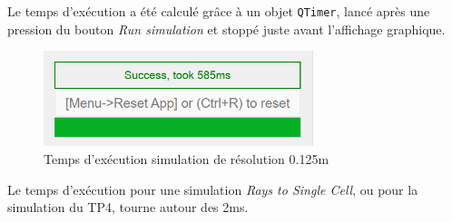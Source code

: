 Le temps d'exécution a été calculé grâce à un objet \texttt{QTimer}, lancé après une pression du bouton \textit{Run simulation} et stoppé juste avant l'affichage graphique.
\begin{figure}[H]
    \centering
    \includegraphics[width=0.7\textwidth]{latex/images/time-0.125m.png}
    \caption{Temps d'exécution simulation de résolution 0.125m}
    \label{fig:time-0.125m}
\end{figure}

Le temps d'exécution pour une simulation \textit{Rays to Single Cell}, ou pour la simulation du TP4, tourne autour des 2ms.
